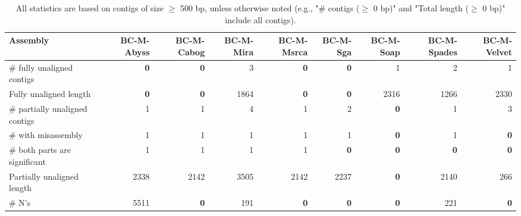 \documentclass[12pt,a4paper]{article}
\begin{document}
\begin{table}[ht]
\begin{center}
\caption{All statistics are based on contigs of size $\geq$ 500 bp, unless otherwise noted (e.g., "\# contigs ($\geq$ 0 bp)" and "Total length ($\geq$ 0 bp)" include all contigs).}
\begin{tabular}{|l*{8}{|r}|}
\hline
Assembly & BC-M-Abyss & BC-M-Cabog & BC-M-Mira & BC-M-Msrca & BC-M-Sga & BC-M-Soap & BC-M-Spades & BC-M-Velvet \\ \hline
\# fully unaligned contigs & {\bf 0} & {\bf 0} & 3 & {\bf 0} & {\bf 0} & 1 & 2 & 1 \\ \hline
Fully unaligned length & {\bf 0} & {\bf 0} & 1864 & {\bf 0} & {\bf 0} & 2316 & 1266 & 2330 \\ \hline
\# partially unaligned contigs & 1 & 1 & 4 & 1 & 2 & {\bf 0} & 1 & 3 \\ \hline
\hspace{5mm}\# with misassembly & 1 & 1 & 1 & 1 & 1 & {\bf 0} & 1 & {\bf 0} \\ \hline
\hspace{5mm}\# both parts are significant & 1 & 1 & 1 & 1 & {\bf 0} & {\bf 0} & {\bf 0} & {\bf 0} \\ \hline
Partially unaligned length & 2338 & 2142 & 3505 & 2142 & 2237 & {\bf 0} & 2140 & 266 \\ \hline
\# N's & 5511 & {\bf 0} & 191 & {\bf 0} & {\bf 0} & {\bf 0} & 221 & {\bf 0} \\ \hline
\end{tabular}
\end{center}
\end{table}
\end{document}
